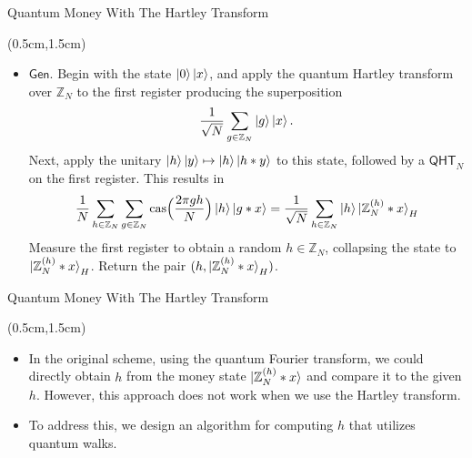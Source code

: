 \documentclass{beamer}
\theoremstyle{definition}
\newcommand{\cas}{\mathrm{cas}}
\newcommand{\qht}{\mathsf{QHT}}
\newcommand{\gen}{\mathsf{Gen}}
\begin{document}
\begin{frame}{Quantum Money With The Hartley Transform}
    
    \begin{textblock*}{12cm}(0.5cm,1.5cm)
            
        
       
        \begin{itemize}
            \item $\gen$. Begin with the state $\ket{0}\ket{x}$, and apply the quantum Hartley transform over $\mathbb{Z}_N$ to the first register producing the superposition
            \[ \frac{1}{\sqrt{N}} \sum_{g \in \mathbb{Z}_N} \ket{g}\ket{x}. \]
            Next, apply the unitary $\ket{h}\ket{y} \mapsto \ket{h}\ket{h * y}$ to this state, followed by a $\qht_N$ on the first register. This results in
            \[ \frac{1}{N} \sum_{h \in \mathbb{Z}_N} \sum_{g \in \mathbb{Z}_N} \cas\Big(\frac{2\pi gh}{N}\Big) \ket{h}\ket{g * x} = \frac{1}{\sqrt{N}} \sum_{h \in \mathbb{Z}_N} \ket{h} \ket{\mathbb{Z}_N^{(h)} * x}_H \]
            Measure the first register to obtain a random $h \in \mathbb{Z}_N$, collapsing the state to $\ket{\mathbb{Z}_N^{(h)} * x}_H$. Return the pair $(h, \ket{\mathbb{Z}_N^{(h)} * x}_H)$.

        \end{itemize}
        
       
        
    \end{textblock*}


\end{frame}





\begin{frame}{Quantum Money With The Hartley Transform}
    
    \begin{textblock*}{12cm}(0.5cm,1.5cm)
        \begin{itemize}
            \item  In the original scheme, using the quantum Fourier transform, we could directly obtain $h$ from the money state $\ket{\mathbb{Z}_N^{(h)} * x}$ and compare it to the given $h$. However, this approach does not work when we use the Hartley transform. 
            \vspace{1cm}
            \item  To address this, we design an algorithm for computing $h$ that utilizes quantum walks. 

        \end{itemize}
        
        
       
        
    \end{textblock*}


\end{frame}
\end{document}

